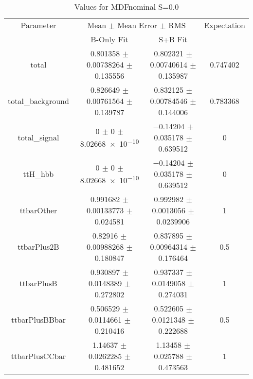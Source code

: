 \begin{table}
\centering
\caption{Values for MDFnominal S=0.0}
\begin{tabular}{cccc}
\toprule
Parameter & \multicolumn{2}{c}{Mean $\pm$ Mean Error $\pm$ RMS} & Expectation\\
 & B-Only Fit & S+B Fit & \\
\midrule
total & \num{0.801358} $\pm$ \num{0.00738264} $\pm$ \num{0.135556} & \num{0.802321} $\pm$ \num{0.00740614} $\pm$ \num{0.135987} & \num{0.747402}\\
total\_background & \num{0.826649} $\pm$ \num{0.00761564} $\pm$ \num{0.139787} & \num{0.832125} $\pm$ \num{0.00784546} $\pm$ \num{0.144006} & \num{0.783368}\\
total\_signal & \num{0} $\pm$ \num{0} $\pm$ \num{8.02668e-10} & \num{-0.14204} $\pm$ \num{0.035178} $\pm$ \num{0.639512} & \num{0}\\
ttH\_hbb & \num{0} $\pm$ \num{0} $\pm$ \num{8.02668e-10} & \num{-0.14204} $\pm$ \num{0.035178} $\pm$ \num{0.639512} & \num{0}\\
ttbarOther & \num{0.991682} $\pm$ \num{0.00133773} $\pm$ \num{0.024581} & \num{0.992982} $\pm$ \num{0.0013056} $\pm$ \num{0.0239906} & \num{1}\\
ttbarPlus2B & \num{0.82916} $\pm$ \num{0.00988268} $\pm$ \num{0.180847} & \num{0.837895} $\pm$ \num{0.00964314} $\pm$ \num{0.176464} & \num{0.5}\\
ttbarPlusB & \num{0.930897} $\pm$ \num{0.0148389} $\pm$ \num{0.272802} & \num{0.937337} $\pm$ \num{0.0149058} $\pm$ \num{0.274031} & \num{1}\\
ttbarPlusBBbar & \num{0.506529} $\pm$ \num{0.0114661} $\pm$ \num{0.210416} & \num{0.522605} $\pm$ \num{0.0121348} $\pm$ \num{0.222688} & \num{0.5}\\
ttbarPlusCCbar & \num{1.14637} $\pm$ \num{0.0262285} $\pm$ \num{0.481652} & \num{1.13458} $\pm$ \num{0.025788} $\pm$ \num{0.473563} & \num{1}\\
\bottomrule
\end{tabular}
\end{table}